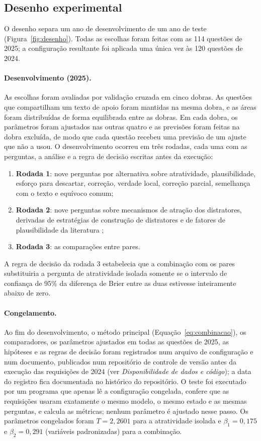 \subsection{Desenho experimental}\label{sec:desenho}

O desenho separa um ano de desenvolvimento de um ano de teste (Figura~\ref{fig:desenho}). Todas as escolhas foram feitas com as 114 questões de 2025; a configuração resultante foi aplicada uma única vez às 120 questões de 2024.

\paragraph{Desenvolvimento (2025).} As escolhas foram avaliadas por validação cruzada em cinco dobras. As questões que compartilham um texto de apoio foram mantidas na mesma dobra, e as áreas foram distribuídas de forma equilibrada entre as dobras. Em cada dobra, os parâmetros foram ajustados nas outras quatro e as previsões foram feitas na dobra excluída, de modo que cada questão recebeu uma previsão de um ajuste que não a usou. O desenvolvimento ocorreu em três rodadas, cada uma com as perguntas, a análise e a regra de decisão escritas antes da execução:
\begin{enumerate}[nosep]
  \item \textbf{Rodada 1}: nove perguntas por alternativa sobre atratividade, plausibilidade, esforço para descartar, correção, verdade local, correção parcial, semelhança com o texto e equívoco comum;
  \item \textbf{Rodada 2}: nove perguntas sobre mecanismos de atração dos distratores, derivadas de estratégias de construção de distratores e de fatores de plausibilidade da literatura \citep{nagai2025,lee2025};
  \item \textbf{Rodada 3}: as comparações entre pares.
\end{enumerate}
A regra de decisão da rodada 3 estabelecia que a combinação com os pares substituiria a pergunta de atratividade isolada somente se o intervalo de confiança de 95\% da diferença de Brier entre as duas estivesse inteiramente abaixo de zero.

\paragraph{Congelamento.} Ao fim do desenvolvimento, o método principal (Equação~\eqref{eq:combinacao}), os comparadores, os parâmetros ajustados em todas as questões de 2025, as hipóteses e as regras de decisão foram registrados num arquivo de configuração e num documento, publicados num repositório de controle de versão antes da execução das requisições de 2024 (ver \emph{Disponibilidade de dados e código}); a data do registro fica documentada no histórico do repositório. O teste foi executado por um programa que apenas lê a configuração congelada, confere que as requisições usaram exatamente o mesmo modelo, o mesmo estado e as mesmas perguntas, e calcula as métricas; nenhum parâmetro é ajustado nesse passo. Os parâmetros congelados foram $T = 2{,}2601$ para a atratividade isolada e $\beta_1 = 0{,}175$ e $\beta_2 = 0{,}291$ (variáveis padronizadas) para a combinação.

